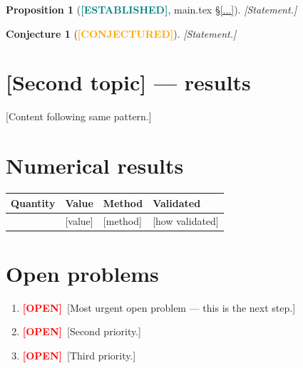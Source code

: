 \documentclass[11pt, a4paper]{article}
\newcommand{\established}{\textcolor{teal}{\textbf{[ESTABLISHED]}}}
\newcommand{\conjectured}{\textcolor{orange}{\textbf{[CONJECTURED]}}}
\newcommand{\open}{\textcolor{red}{\textbf{[OPEN]}}}
\theoremstyle{plain}
\newtheorem{proposition}[theorem]{Proposition}
\newtheorem{conjecture}[theorem]{Conjecture}
\theoremstyle{definition}
\begin{document}
\begin{proposition}[\established, main.tex \S\ref{...}]
[Statement.]
\end{proposition}

\begin{conjecture}[\conjectured]
[Statement.]
\end{conjecture}

\section{[Second topic] — results}
\label{sec:topic2results}

[Content following same pattern.]

\section{Numerical results}
\label{sec:numericresults}


\begin{center}
\begin{tabular}{llll}
\toprule
Quantity & Value & Method & Validated \\
\midrule
[quantity] & [value] & [method] & [how validated] \\
\bottomrule
\end{tabular}
\end{center}

\section{Open problems}
\label{sec:open}


\begin{enumerate}[label=\textbf{O\arabic*.}]
  \item \open\ [Most urgent open problem — this is the next step.]
  \item \open\ [Second priority.]
  \item \open\ [Third priority.]
\end{enumerate}
\end{document}
